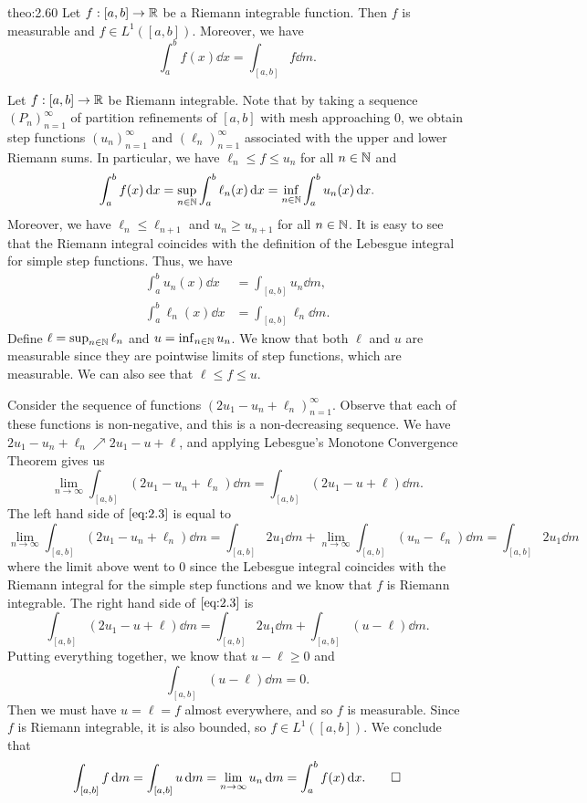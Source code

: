 \begin{theo}{theo:2.60}
    Let $f : [a, b] \to \mathbb{R}$ be a Riemann integrable function. Then $f$ 
    is measurable and $f \in L^1([a, b])$. Moreover, we have 
    \[ \int_a^b f(x)\dd x = \int_{[a, b]} f\dd m. \] 
\end{theo}
\begin{pf}
    Let $f : [a, b] \to \mathbb{R}$ be Riemann integrable. Note that by taking a 
    sequence $(P_n)_{n=1}^\infty$ of partition refinements of $[a, b]$ with 
    mesh approaching $0$, we obtain step functions $(u_n)_{n=1}^\infty$ 
    and $(\ell_n)_{n=1}^\infty$ associated with the upper and lower 
    Riemann sums. In particular, we have $\ell_n \leq f \leq u_n$ 
    for all $n \in \mathbb{N}$ and 
    \[ \int_a^b f(x)\,\mathrm{d} x = \sup_{n\in\mathbb{N}} \int_a^b \ell_n(x)\,\mathrm{d} x 
    = \inf_{n\in\mathbb{N}} \int_a^b u_n(x)\,\mathrm{d} x. \] 
    Moreover, we have $\ell_n \leq \ell_{n+1}$ and $u_n \geq u_{n+1}$ for all 
    $n \in \mathbb{N}$. It is easy to see that the Riemann integral coincides with 
    the definition of the Lebesgue integral for simple step functions. 
    Thus, we have 
    \begin{align*}
        \int_a^b u_n(x)\dd x &= \int_{[a, b]} u_n\dd m, \\
        \int_a^b \ell_n(x)\dd x &= \int_{[a, b]} \ell_n\dd m. 
    \end{align*}
    Define $\ell = \sup_{n\in\mathbb{N}} \ell_n$ and $u = \inf_{n\in\mathbb{N}} u_n$. 
    We know that both $\ell$ and $u$ are measurable since they are 
    pointwise limits of step functions, which are measurable. We can 
    also see that $\ell \leq f \leq u$. 

    Consider the sequence of functions $(2u_1 - u_n + \ell_n)_{n=1}^\infty$. 
    Observe that each of these functions is non-negative, and this is a 
    non-decreasing sequence. We have $2u_1 - u_n + \ell_n \nearrow 2u_1 - u + 
    \ell$, and applying Lebesgue's Monotone Convergence Theorem gives us 
    \begin{equation} \label{eq:2.3} 
        \lim_{n\to\infty} \int_{[a, b]} (2u_1 - u_n + \ell_n)\dd m 
        = \int_{[a, b]} (2u_1 - u + \ell)\dd m.
    \end{equation} 
    The left hand side of $\eqref{eq:2.3}$ is equal to 
    \[ \lim_{n\to\infty} \int_{[a, b]} (2u_1 - u_n + \ell_n)\dd m 
    = \int_{[a, b]} 2u_1\dd m + \lim_{n\to\infty} \int_{[a, b]} (u_n - \ell_n)\dd m 
    = \int_{[a, b]} 2u_1\dd m \] 
    where the limit above went to $0$ since the Lebesgue integral coincides 
    with the Riemann integral for the simple step functions and we know that 
    $f$ is Riemann integrable. The right hand side of $\eqref{eq:2.3}$ is 
    \[ \int_{[a, b]} (2u_1 - u + \ell)\dd m = \int_{[a, b]} 2u_1\dd m + 
    \int_{[a, b]} (u - \ell)\dd m. \] 
    Putting everything together, we know that $u - \ell \geq 0$ and 
    \[ \int_{[a, b]} (u - \ell) \dd m = 0. \] 
    Then we must have $u = \ell = f$ almost everywhere, and so $f$ is 
    measurable. Since $f$ is Riemann integrable, it is also bounded, so 
    $f \in L^1([a, b])$. We conclude that 
    \[ \int_{[a, b]} f\,\mathrm{d} m = \int_{[a, b]} u\,\mathrm{d} m 
    = \lim_{n\to\infty} u_n\,\mathrm{d} m = \int_a^b f(x)\,\mathrm{d} x. \qedhere \] 
\end{pf}

